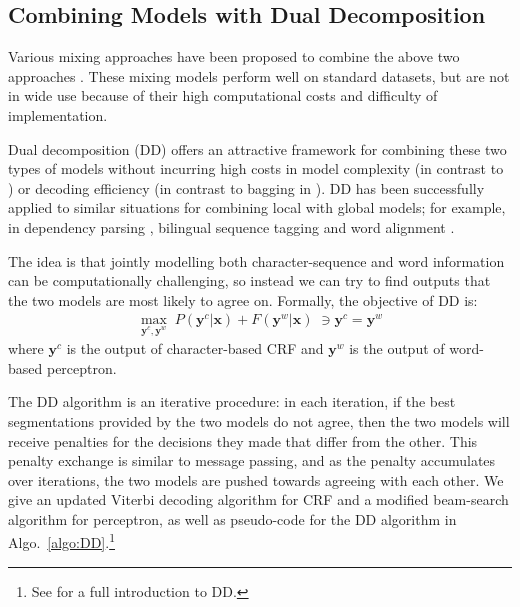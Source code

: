 \subsection{Combining Models with Dual Decomposition} 
Various mixing approaches have been proposed to combine the above two approaches \cite{Wang:2006:SIGHAN,Lin:2009:CICLing,Sun:2009:HLT-NAACL,Sun:2010:COLING,Wang:2010:COLING}. 
These mixing models perform well on standard datasets, but are not in wide use because of their high computational costs and difficulty of implementation.

Dual decomposition (DD) \cite{Rush:2010:EMNLP} offers an attractive framework for combining these two types of models without incurring high costs in model complexity (in contrast to \cite{Sun:2009:HLT-NAACL}) or decoding efficiency (in contrast to bagging in \cite{Wang:2006:SIGHAN,Sun:2010:COLING}). DD has been successfully applied to similar situations for combining local with global models; for example, in dependency parsing \cite{Koo:2010:EMNLP}, bilingual sequence tagging \cite{Wang:2013:ACL} and word alignment \cite{Denero:2011:ACL}.  

The idea is that jointly modelling both character-sequence and word information can be computationally challenging, so instead we can try to find outputs that the two models are most likely to agree on.
Formally, the objective of DD is:
\begin{align*}
   \max_{\mathbf{y^\textit{c}}, \mathbf{y^\textit{w}}}  \; P(\mathbf{y^\textit{c}} | \mathbf{x}) + F(\mathbf{y^\textit{w}} | \mathbf{x}) \;  \ni \mathbf{y^\textit{c}} = \mathbf{y^\textit{w}}
\end{align*}
\noindent where $\mathbf{y^\textit{c}}$ is the output of character-based CRF and $\mathbf{y^\textit{w}}$ is the output of word-based perceptron.

The DD algorithm is an iterative procedure: in each iteration, if the best segmentations provided by the two models do not agree, then the two models will receive penalties for the decisions they made that differ from the other. This penalty exchange is similar to message passing, and as the penalty accumulates over iterations, the two models are pushed towards agreeing with each other. We give an updated Viterbi decoding algorithm for CRF and a modified beam-search algorithm for perceptron, as well as pseudo-code for the DD algorithm in Algo.~\ref{algo:DD}.\footnote{See  for a full introduction to DD.}

